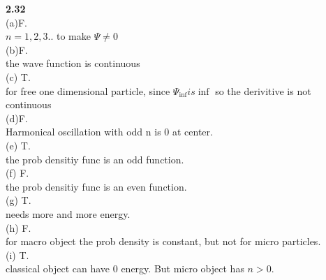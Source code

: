 \documentclass{article}
\begin{document}
\textbf{2.32}\\
(a)F.\\
$n = 1,2,3..$ to make $\Psi \neq 0$\\
(b)F.\\
the wave function is continuous \\
(c) T.\\
for free one dimensional particle, since $\Psi_{\inf} is \inf$ so the derivitive is not continuous\\
(d)F.\\
Harmonical oscillation with odd n is 0 at center.\\
(e) T.\\
the prob densitiy func is an odd function.\\
(f) F.\\
the prob densitiy func is an even function.\\
(g) T.\\
needs more and more energy.\\
(h) F.\\
for macro object the prob density is constant, but not for micro particles.\\
(i) T.\\
classical object can have 0 energy. But micro object has $n>0$.\\
\newline
\end{document}
